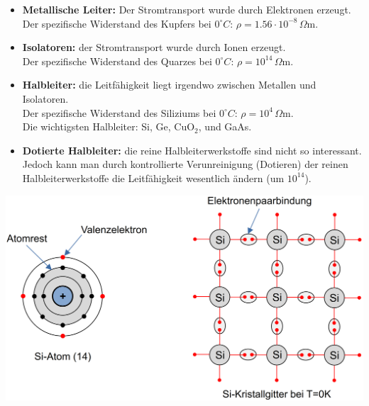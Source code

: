 \begin{itemize}
    \item \textbf{Metallische Leiter:} Der Stromtransport wurde durch Elektronen erzeugt.\\
    Der spezifische Widerstand des Kupfers bei $0^\circ C$:  $\rho = 1.56 \cdot 10^{-8} \, \Omega \text{m}$.
    \item \textbf{Isolatoren:} der Stromtransport wurde durch Ionen erzeugt.\\
    Der spezifische Widerstand des Quarzes bei $0^\circ C$: $\rho = 10^{14} \, \Omega \text{m}$.
    \item \textbf{Halbleiter:} die Leitfähigkeit liegt irgendwo zwischen Metallen und Isolatoren.\\
    Der spezifische Widerstand des Siliziums bei $0^\circ C$: $\rho = 10^4 \, \Omega \text{m}$.\\
    Die wichtigsten Halbleiter: Si, Ge, CuO$_2$, und GaAs.
    \item \textbf{Dotierte Halbleiter:} die reine Halbleiterwerkstoffe sind nicht so interessant.\\
    Jedoch kann man durch kontrollierte Verunreinigung (Dotieren) der reinen Halbleiterwerkstoffe die Leitfähigkeit 
    wesentlich ändern (um $10^{14}$).
\end{itemize}
\includegraphics[width=\columnwidth]{images/Bild2.png}

\columnbreak
